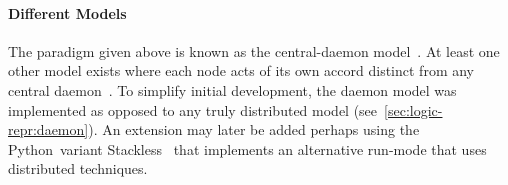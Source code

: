 \paragraph{Different Models}
The paradigm given above is known as the central-daemon model~\autocite{dew:sem}.
At least one other model exists where each node acts
  of its own accord distinct from any central daemon~\autocite{ssa:dist}.
To simplify initial development, the daemon model was implemented
  as opposed to any truly distributed model (see~\autoref{sec:logic-repr:daemon}).
An extension may later be added \Dash
  perhaps using the Python~variant Stackless~\autocite{stackless} \Dash
  that implements an alternative run-mode that uses distributed techniques.

